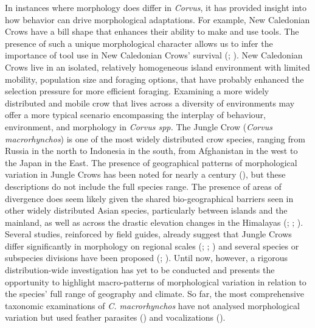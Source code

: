 \documentclass[10pt,a4paper]{article}
\begin{document}
In instances where morphology does differ in \emph{Corvus}, it has provided insight into how behavior can drive morphological adaptations.
For example, New Caledonian Crows have a bill shape that enhances their ability to make and use tools.
The presence of such a unique morphological character allows us to infer the importance of tool use in New Caledonian Crows' survival (; ).
New Caledonian Crows live in an isolated, relatively homogeneous island environment with limited mobility, population size and foraging options, that have probably enhanced the selection pressure for more efficient foraging.
Examining a more widely distributed and mobile crow that lives across a diversity of environments may offer a more typical scenario encompassing the interplay of behaviour, environment, and morphology in \emph{Corvus spp.}
The Jungle Crow (\emph{Corvus macrorhynchos}) is one of the most widely distributed crow species, ranging from Russia in the north to Indonesia in the south, from Afghanistan in the west to the Japan in the East.
The presence of geographical patterns of morphological variation in Jungle Crows has been noted for nearly a century (), but these descriptions do not include the full species range.
The presence of areas of divergence does seem likely given the shared bio-geographical barriers seen in other widely distributed Asian species, particularly between islands and the mainland, as well as across the drastic elevation changes in the Himalayas (; ; ).
Several studies, reinforced by field guides, already suggest that Jungle Crows differ significantly in morphology on regional scales (; ; ) and several species or subspecies divisions have been proposed (; ).
Until now, however, a rigorous distribution-wide investigation has yet to be conducted and presents the opportunity to highlight macro-patterns of morphological variation in relation to the species' full range of geography and climate.
So far, the most comprehensive taxonomic examinations of \emph{C. macrorhynchos} have not analysed morphological variation but used feather parasites () and vocalizations ().
\end{document}
